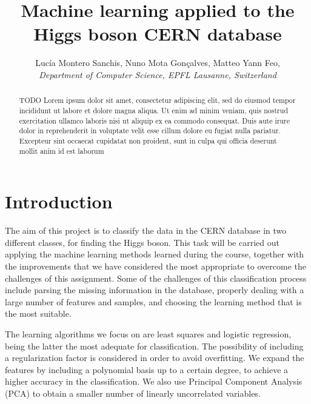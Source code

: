 \documentclass[10pt,conference,compsocconf]{IEEEtran}
\begin{document}
\title{Machine learning applied to the Higgs boson CERN database}

\author{
  Luc\'{i}a Montero Sanchis, Nuno Mota Gon\c{c}alves, Matteo Yann Feo,  \\
  \textit{Department of Computer Science, EPFL Lausanne, Switzerland}
}

\maketitle

\begin{abstract}
  TODO
  Lorem ipsum dolor sit amet, consectetur adipiscing elit, sed do eiusmod tempor incididunt ut labore et dolore magna aliqua. Ut enim ad minim veniam, quis nostrud exercitation ullamco laboris  nisi ut aliquip ex ea commodo consequat. Duis aute irure dolor in reprehenderit in voluptate velit esse cillum dolore eu fugiat nulla pariatur. Excepteur sint occaecat cupidatat non  proident, sunt in culpa qui officia deserunt mollit anim id est laborum
\end{abstract}

\section{Introduction}
	The aim of this project is to classify the data in the CERN database in two different classes, for finding the Higgs boson. This task will be carried out applying the machine learning methods learned during the course, together with the improvements that we have considered the most appropriate to overcome the challenges of this assignment. Some of the challenges of this classification process include parsing the missing information in the database, properly dealing with a large number of features and samples, and choosing the learning method that is the most suitable.

	The learning algorithms we focus on are least squares and logistic regression, being the latter the most adequate for classification. The possibility of including a regularization factor is considered in order to avoid overfitting. We expand the features by including a polynomial basis up to a certain degree, to achieve a higher accuracy in the classification. We also use Principal Component Analysis (PCA) to obtain a smaller number of linearly uncorrelated variables.

\end{document}

